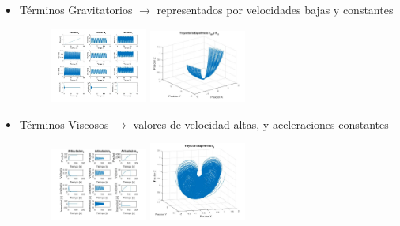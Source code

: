 	\begin{itemize}
		\item Términos Gravitatorios $ \rightarrow $ representados por velocidades bajas y constantes
		\begin{figure}[h]
			\centering
			\includegraphics[width=0.3\textwidth]{graftheta10y11}
			\includegraphics[width=0.3\textwidth]{Traytheta10y11}
		\end{figure}

		\item Términos Viscosos $ \rightarrow $ valores de velocidad altas, y aceleraciones constantes
			\begin{figure}[h]
			\centering
			\includegraphics[width=0.3\textwidth]{graftheta9}
			\includegraphics[width=0.3\textwidth]{Traytheta9}
		\end{figure}


\end{itemize}
